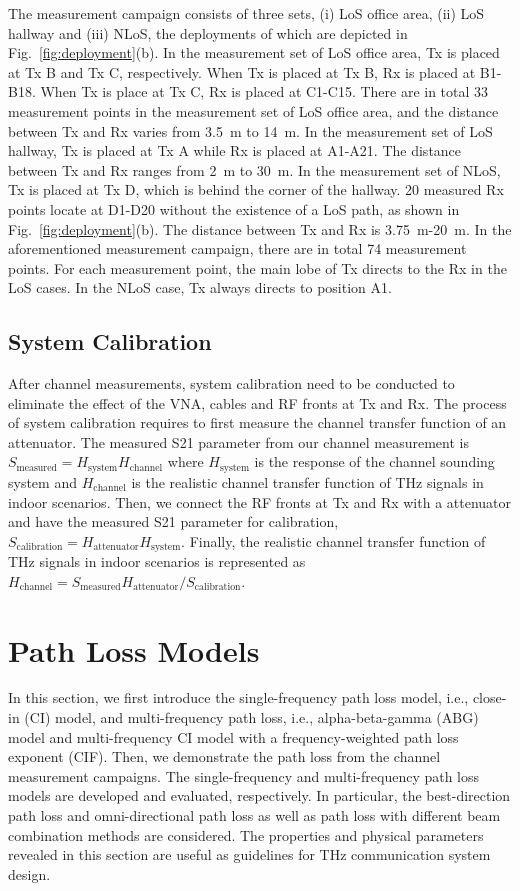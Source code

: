 \documentclass[conference]{IEEEtran}
\begin{document}
\par The measurement campaign consists of three sets, (i) LoS office area, (ii) LoS hallway and (iii) NLoS, the deployments of which are depicted in Fig.~\ref{fig:deployment}(b). In the measurement set of LoS office area, Tx is placed at Tx B and Tx C, respectively. When Tx is placed at Tx B, Rx is placed at B1-B18. When Tx is place at Tx C, Rx is placed at C1-C15. There are in total 33 measurement points in the measurement set of LoS office area, and the distance between Tx and Rx varies from 3.5~m to 14~m. In the measurement set of LoS hallway, Tx is placed at Tx A while Rx is placed at A1-A21. The distance between Tx and Rx ranges from 2~m to 30~m. In the measurement set of NLoS, Tx is placed at Tx D, which is behind the corner of the hallway. 20 measured Rx points locate at D1-D20 without the existence of a LoS path, as shown in Fig.~\ref{fig:deployment}(b). The distance between Tx and Rx is 3.75~m-20~m. In the aforementioned measurement campaign, there are in total 74 measurement points. For each measurement point, the main lobe of Tx directs to the Rx in the LoS cases. In the NLoS case, Tx always directs to position A1. 

\subsection{System Calibration}
After channel measurements, system calibration need to be conducted to eliminate the effect of the VNA, cables and RF fronts at Tx and Rx. The process of system calibration requires to first measure the channel transfer function of an attenuator.
The measured S21 parameter from our channel measurement is $S_{\text{measured}}=H_{\text{system}}H_{\text{channel}}$ where $H_{\text{system}}$ is the response of the channel sounding system and $H_{\text{channel}}$ is the realistic channel transfer function of THz signals in indoor scenarios. Then, we connect the RF fronts at Tx and Rx with a attenuator and have the measured S21 parameter for calibration, $S_{\text{calibration}}=H_{\text{attenuator}}H_{\text{system}}$. Finally, the realistic channel transfer function of THz signals in indoor scenarios is represented as $H_{\text{channel}}=S_{\text{measured}}H_{\text{attenuator}}/S_{\text{calibration}}$.

\section{Path Loss Models} 
In this section, we first introduce the single-frequency path loss model, i.e., close-in (CI) model, and multi-frequency path loss, i.e., alpha-beta-gamma (ABG) model and multi-frequency CI model with a frequency-weighted path loss exponent (CIF). Then, we demonstrate the path loss from the channel measurement campaigns. The single-frequency and multi-frequency path loss models are developed and evaluated, respectively. In particular, the best-direction path loss and omni-directional path loss as well as path loss with different beam combination methods are considered. The properties and physical parameters revealed in this section are useful as guidelines for THz communication system design. 
\end{document}
